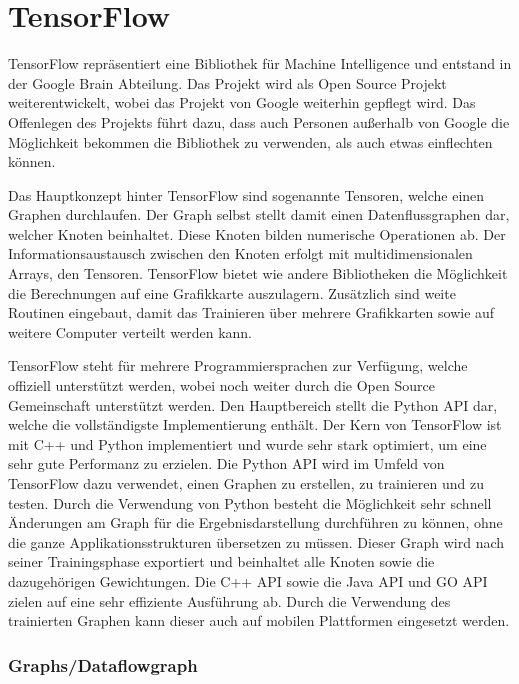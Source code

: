 \chapter{TensorFlow}
\label{cha:TensorFlow}

TensorFlow repräsentiert eine Bibliothek für Machine Intelligence und entstand in der Google Brain Abteilung.
Das Projekt wird als Open Source Projekt weiterentwickelt, wobei das Projekt von Google weiterhin gepflegt wird. 
Das Offenlegen des Projekts führt dazu, dass auch Personen außerhalb von Google die Möglichkeit bekommen die Bibliothek zu verwenden, als auch etwas einflechten können. \newline

\noindent
Das Hauptkonzept hinter TensorFlow sind sogenannte Tensoren, welche einen Graphen durchlaufen. 
Der Graph selbst stellt damit einen Datenflussgraphen dar, welcher Knoten beinhaltet. 
Diese Knoten bilden numerische Operationen ab.
Der Informationsaustausch zwischen den Knoten erfolgt mit multidimensionalen Arrays, den Tensoren.
TensorFlow bietet wie andere Bibliotheken die Möglichkeit die Berechnungen auf eine Grafikkarte auszulagern.
Zusätzlich sind weite Routinen eingebaut, damit das Trainieren über mehrere Grafikkarten sowie auf weitere Computer verteilt werden kann. \newline

\noindent
TensorFlow steht für mehrere Programmiersprachen zur Verfügung, welche offiziell unterstützt werden, wobei noch weiter durch die Open Source Gemeinschaft unterstützt werden.
Den Hauptbereich stellt die Python API dar, welche die vollständigste Implementierung enthält. 
Der Kern von TensorFlow ist mit C++ und Python implementiert und wurde sehr stark optimiert, um eine sehr gute Performanz zu erzielen.
Die Python API wird im Umfeld von TensorFlow dazu verwendet, einen Graphen zu erstellen, zu trainieren und zu testen. 
Durch die Verwendung von Python besteht die Möglichkeit sehr schnell Änderungen am Graph für die Ergebnisdarstellung durchführen zu können, ohne die ganze Applikationsstrukturen übersetzen zu müssen. 
Dieser Graph wird nach seiner Trainingsphase exportiert und beinhaltet alle Knoten sowie die dazugehörigen Gewichtungen. 
Die C++ API sowie die Java API und GO API zielen auf eine sehr effiziente Ausführung ab.
Durch die Verwendung des trainierten Graphen kann dieser auch auf mobilen Plattformen eingesetzt werden.

\subsection{Graphs/Dataflowgraph}


